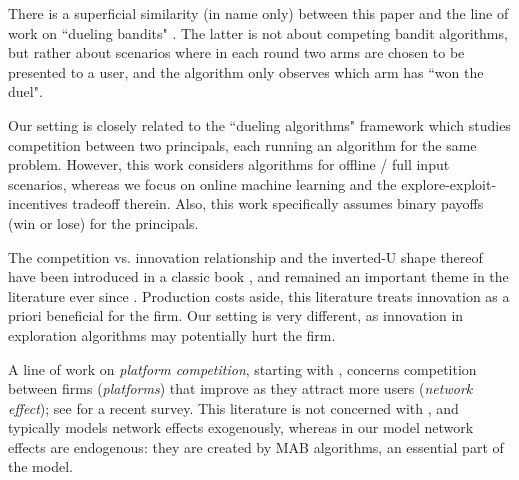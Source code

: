 There is a superficial similarity (in name only) between this paper and the line of work on ``dueling bandits"
    \citep[\eg][]{Yue-dueling12,Yue-dueling-icml09}.
The latter is not about competing bandit algorithms, but rather about scenarios where in each round two arms are chosen to be presented to a user, and the algorithm only observes which arm has ``won the duel".

Our setting is closely related to the ``dueling algorithms" framework \citep{DuelingAlgs-stoc11} which studies competition between two principals, each running an algorithm for the same problem. However, this work considers algorithms for offline / full input scenarios, whereas we focus on online machine learning and the explore-exploit-incentives tradeoff therein. Also, this work specifically assumes binary payoffs (\ie win or lose) for the principals. 

 The competition vs. innovation relationship and the inverted-U shape thereof have been introduced in a classic book \citep{Schumpeter-42}, and remained an important theme in the literature ever since \cite[\eg][]{Aghion-QJE05,Vives-08}. Production costs aside, this literature treats innovation as a priori beneficial for the firm. Our setting is very different, as innovation in exploration algorithms may potentially hurt the firm.


A line of work on \emph{platform competition}, starting with \cite{Rysman09}, concerns competition between firms (\emph{platforms}) that improve as they attract more users (\emph{network effect}); see \citet{Weyl-White-14} for a recent survey. This literature is not concerned with \innovation, and typically models network effects exogenously, whereas in our model network effects are endogenous: they are created by MAB algorithms, an essential part of the model. 

